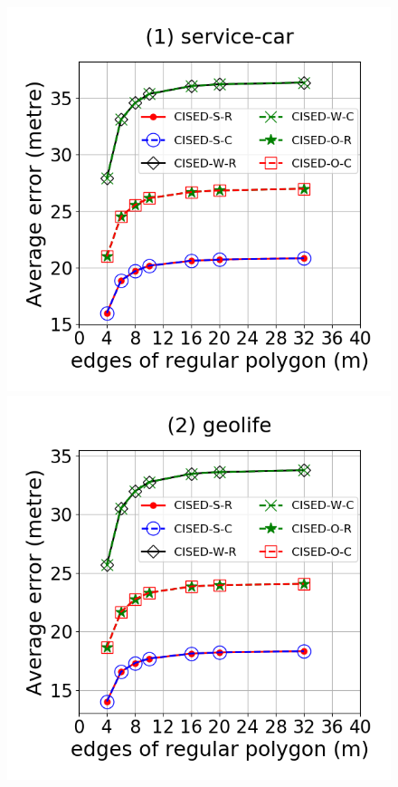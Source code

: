 \begin{figure}[tb!]
\centering
\includegraphics[scale = 0.280]{Figures/Exp-M-e-60-error-service.png}
\includegraphics[scale = 0.280]{Figures/Exp-M-e-60-error-geolife.png}

\end{figure}
